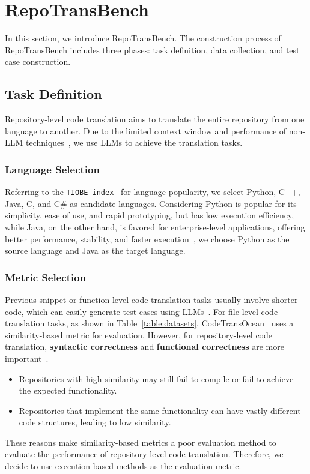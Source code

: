 \section{RepoTransBench}

In this section, we introduce RepoTransBench. The construction process of RepoTransBench includes three phases: task definition, data collection, and test case construction.

\subsection{Task Definition}
Repository-level code translation aims to translate the entire repository from one language to another. Due to the limited context window and performance of non-LLM techniques~\cite{pan2024lost}, we use LLMs to achieve the translation tasks.

\subsubsection{Language Selection}
Referring to the \texttt{TIOBE index}~\cite{TIOBE-Index} for language popularity, we select Python, C++, Java, C, and C\# as candidate languages. Considering Python is popular for its simplicity, ease of use, and rapid prototyping, but has low execution efficiency, while Java, on the other hand, is favored for enterprise-level applications, offering better performance, stability, and faster execution~\cite{szafraniec2022code}, we choose Python as the source language and Java as the target language. 

\subsubsection{Metric Selection}
Previous snippet or function-level code translation tasks usually involve shorter code, which can easily generate test cases using LLMs~\cite{puri2021codenet,ahmad2021avatar,liu2024your,yan2023codetransocean}. For file-level code translation tasks, as shown in Table~\ref{table:datasets}, CodeTransOcean~\cite{yan2023codescope} uses a similarity-based metric for evaluation. However, for repository-level code translation, \textbf{syntactic correctness} and \textbf{functional correctness} are more important~\cite{pan2024lost}. 
\begin{itemize}[left=10pt]
    \item Repositories with high similarity may still fail to compile or fail to achieve the expected functionality.
    \item Repositories that implement the same functionality can have vastly different code structures, leading to low similarity.
\end{itemize}
These reasons make similarity-based metrics a poor evaluation method to evaluate the performance of repository-level code translation. Therefore, we decide to use execution-based methods as the evaluation metric. 

